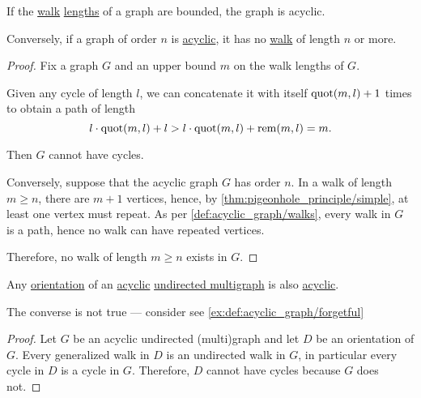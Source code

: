 \begin{proposition}\label{thm:acyclic_graph_walk_length}
  If the \hyperref[def:graph_walk]{walk} \hyperref[def:graph_walk/length]{lengths} of a graph are bounded, the graph is acyclic.

  Conversely, if a graph of  order \( n \) is \hyperref[def:acyclic_graph]{acyclic}, it has no \hyperref[def:graph_walk]{walk} of length \( n \) or more.
\end{proposition}
\begin{proof}
  \SufficiencySubProof Fix a graph \( G \) and an upper bound \( m \) on the walk lengths of \( G \).

  Given any cycle of length \( l \), we can concatenate it with itself \( \operatorname{quot}(m, l) + 1 \) times to obtain a path of length
  \begin{equation*}
    l \cdot \operatorname{quot}(m, l) + l > l \cdot \operatorname{quot}(m, l) + \operatorname{rem}(m, l) = m.
  \end{equation*}

  Then \( G \) cannot have cycles.

  \NecessitySubProof Conversely, suppose that the acyclic graph \( G \) has order \( n \). In a walk of length \( m \geq n \), there are \( m + 1 \) vertices, hence, by \cref{thm:pigeonhole_principle/simple}, at least one vertex must repeat. As per \cref{def:acyclic_graph/walks}, every walk in \( G \) is a path, hence no walk can have repeated vertices.

  Therefore, no walk of length \( m \geq n \) exists in \( G \).
\end{proof}

\begin{proposition}\label{thm:acyclic_undirected_graph_orientation}
  Any \hyperref[def:multigraph_orientation]{orientation} of an \hyperref[def:acyclic_graph]{acyclic} \hyperref[def:hypergraph/multigraph]{undirected multigraph} is also \hyperref[def:acyclic_graph]{acyclic}.
\end{proposition}
\begin{comments}
  \item The converse is not true --- consider see \cref{ex:def:acyclic_graph/forgetful}
\end{comments}
\begin{proof}
  Let \( G \) be an acyclic undirected (multi)graph and let \( D \) be an orientation of \( G \). Every generalized walk in \( D \) is an undirected walk in \( G \), in particular every cycle in \( D \) is a cycle in \( G \). Therefore, \( D \) cannot have cycles because \( G \) does not.
\end{proof}

